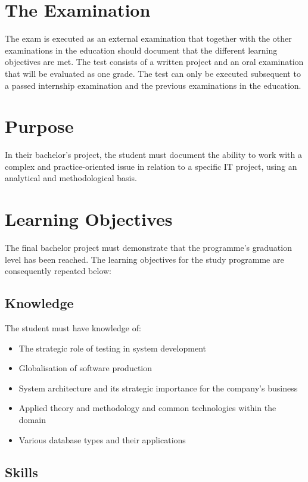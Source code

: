 \documentclass[12pt]{article}
\begin{document}
\section{The Examination}

The exam is executed as an external examination that together with the other examinations in the education should document that the different learning objectives are met. The test consists of a written project and an oral examination that will be evaluated as one grade. The test can only be executed subsequent to a passed internship examination and the previous examinations in the education.

\section{Purpose}

In their bachelor’s project, the student must document the ability to work with a complex and practice-oriented issue in relation to a specific IT project, using an analytical and methodological basis.

\section{Learning Objectives}

The final bachelor project must demonstrate that the programme’s graduation level has been reached. The learning objectives for the study programme are consequently repeated below: 

\subsection{Knowledge}

The student must have knowledge of:
\begin{itemize}
\item The strategic role of testing in system development
\item Globalisation of software production
\item System architecture and its strategic importance for the company’s business
\item Applied theory and methodology and common technologies within the domain
\item Various database types and their applications
\end{itemize}

\subsection{Skills}
\end{document}
